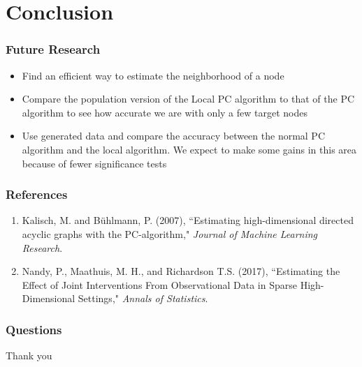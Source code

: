 \documentclass{beamer}
\begin{document}
\begin{frame}
{\begin{figure}
  \centering
\end{figure}
}

\end{frame}

\section{Conclusion}

\begin{frame}
\frametitle{Future Research}
\begin{itemize}
\item Find an efficient way to estimate the neighborhood of a node
\item Compare the population version of the Local PC algorithm to that of the PC algorithm to see how accurate we are with only a few target nodes
\item Use generated data and compare the accuracy between the normal PC algorithm and the local algorithm. We expect to make some gains in this area because of fewer significance tests
\end{itemize}
\end{frame}

\begin{frame}
\frametitle{References}
\begin{enumerate}
\item Kalisch, M. and B\"uhlmann, P. (2007), ``Estimating high-dimensional directed acyclic graphs with the PC-algorithm," \textit{Journal of Machine Learning Research}.
\item Nandy, P., Maathuis, M. H., and Richardson T.S. (2017), ``Estimating the Effect of Joint Interventions From Observational Data in Sparse High-Dimensional Settings," \textit{Annals of Statistics}.
\end{enumerate}
\end{frame}

\begin{frame}
\frametitle{Questions}
\begin{center}
\Large Thank you
\end{center}
\end{frame}
\end{document}
